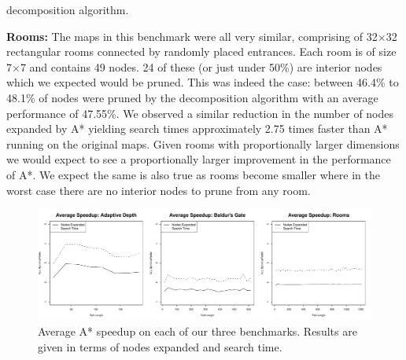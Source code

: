 decomposition algorithm.
\par
\textbf{Rooms:}
The maps in this benchmark were all very similar, comprising of 32$\times$32
rectangular rooms connected by randomly placed entrances.
Each room is of size 7$\times$7 and contains 49 nodes. 
24 of these (or just under 50\%) are interior nodes which we expected would be
pruned.
This was indeed the case: between 46.4\% to 48.1\% of nodes were pruned by 
the decomposition algorithm with an average performance of 47.55\%.
We observed a similar reduction in the number of nodes expanded by A* yielding
search times approximately 2.75 times faster than A* running on the original
maps.
Given rooms with proportionally larger dimensions we would expect to see a
proportionally larger improvement in the performance of A*.
We expect the same is also true as rooms become smaller where in the worst case
there are no interior nodes to prune from any room.

\begin{figure}[t]
       \begin{center}
                       \includegraphics[width=1.95\columnwidth, trim = 10mm 10mm 10mm 0mm]{diagrams/speedup.pdf}
       \end{center}
       \caption{Average A* speedup on each of our three benchmarks. 
		Results are given in terms of nodes expanded and search time.}
\label{fig-speedup}
\end{figure}
